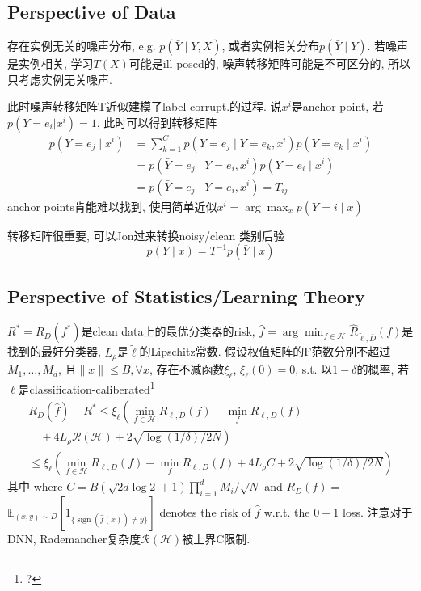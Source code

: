 \documentclass{article}
\begin{document}
\subsection{Perspective of Data}
存在实例无关的噪声分布, e.g. $p(\bar Y \mid Y, X)$, 或者实例相关分布$p(\bar Y \mid Y)$. 若噪声是实例相关, 学习$T(X)$可能是ill-posed的, 噪声转移矩阵可能是不可区分的, 所以只考虑实例无关噪声.

此时噪声转移矩阵T近似建模了label corrupt.的过程. 说$x^i$是anchor point, 若$p(Y=e_i|x^i)=1$, 此时可以得到转移矩阵
\begin{equation}
    \begin{aligned}
    p\left(\bar{Y}=e_{j} \mid x^{i}\right) &=\sum_{k=1}^{C} p\left(\bar{Y}=e_{j} \mid Y=e_{k}, x^{i}\right) p\left(Y=e_{k} \mid x^{i}\right) \\
    &=p\left(\bar{Y}=e_{j} \mid Y=e_{i}, x^{i}\right) p\left(Y=e_{i} \mid x^{i}\right) \\
    &=p\left(\bar{Y}=e_{j} \mid Y=e_{i}, x^{i}\right)=T_{i j}
    \end{aligned}
\end{equation}
anchor points肯能难以找到, 使用简单近似$x^{i}=\arg \max _{x} p(\bar{Y}=i \mid x)$

转移矩阵很重要, 可以Jon过来转换noisy/clean 类别后验
\begin{equation}
    p(Y \mid x)=T^{-1} p(\bar{Y} \mid x)
\end{equation}

\subsection{Perspective of Statistics/Learning Theory}

$R^{*}=R_{D}\left(f^{*}\right)$是clean data上的最优分类器的risk, $\hat{f}=\arg \min _{f \in \mathcal{H}} \widehat{R}_{\tilde{\ell}, \bar{D}}(f)$是找到的最好分类器, $L_\rho$是$\tilde{\ell}$的Lipschitz常数. 假设权值矩阵的F范数分别不超过$M_{1}, \ldots, M_{d}$, 且$\|x\| \le B,\forall x$, 存在不减函数$\xi_{\ell}$, $\xi_{\ell}(0)=0$, s.t.
以$1-\delta$的概率, 若$\ell$是classification-caliberated\footnote{?}
\begin{equation}
    \begin{array}{l}
    R_{D}(\hat{f})-R^{*} \leq \xi_{\ell}\left(\min _{f \in \mathcal{H}} R_{\ell, D}(f)-\min _{f} R_{\ell, D}(f)\right. \\
    \left.\quad+4 L_{\rho} \mathcal{R}(\mathcal{H})+2 \sqrt{\log (1 / \delta) / 2 N}\right) \\
    \leq \xi_{\ell}\left(\min _{f \in \mathcal{H}} R_{\ell, D}(f)-\min _{f} R_{\ell, D}(f)+4 L_{\rho} C+2 \sqrt{\log (1 / \delta) / 2 N}\right)
    \end{array}
\end{equation}
其中
where $C=B(\sqrt{2 d \log 2}+1) \prod_{i=1}^{d} M_{i} / \sqrt{N}$ 
and 
$R_{D}(f)=$
$\mathbb{E}_{(x, y) \sim D}\left[1_{\{\operatorname{sign}(\hat{f}(x)) \neq y\}}\right]$ denotes the risk of $\hat{f}$ w.r.t. the $0-1$ loss.
注意对于DNN, Rademancher复杂度$\mathcal R(\mathcal H)$被上界C限制.
\end{document}
